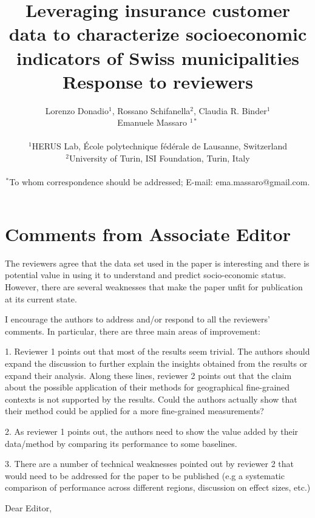 \documentclass[12pt]{article}
\title{Leveraging insurance customer data to characterize socioeconomic indicators of Swiss municipalities \\ \vspace{3mm} Response to reviewers}
\author
{Lorenzo Donadio$^{1}$,  Rossano Schifanella$^{2}$, Claudia R. Binder$^{1}$ \\ Emanuele Massaro $^{1\ast}$\\
\\
\normalsize{$^{1}$HERUS Lab, École polytechnique fédérale de Lausanne, Switzerland}\\
\normalsize{$^{2}$University of Turin, ISI Foundation, Turin, Italy}\\
\\
\normalsize{$^\ast$To whom correspondence should be addressed; E-mail:  ema.massaro@gmail.com.}
}
\date{}
\newenvironment{sciabstract}{%
\begin{quote} \bf}
{\end{quote}}
\begin{document}
 


\baselineskip24pt


\maketitle 




\begin{sciabstract}

\end{sciabstract}


\section*{Comments from Associate Editor}



The reviewers agree that the data set used in the paper is interesting and there is potential value in using it to understand and predict socio-economic status. However, there are several weaknesses that make the paper unfit for publication at its current state.

I encourage the authors to address and/or respond to all the reviewers' comments. In particular, there are three main areas of improvement:

1. Reviewer 1 points out that most of the results seem trivial. The authors should expand the discussion to further explain the insights obtained from the results or expand their analysis. Along these lines, reviewer 2 points out that the claim about the possible application of their methods for geographical fine-grained contexts is not supported by the results. Could the authors actually show that their method could be applied for a more fine-grained measurements?

2. As reviewer 1 points out, the authors need to show the value added by their data/method by comparing its performance to some baselines.

3. There are a number of technical weaknesses pointed out by reviewer 2 that would need to be addressed for the paper to be published (e.g a systematic comparison of performance across different regions, discussion on effect sizes, etc.)

\vspace{1cm}
Dear Editor,
\end{document}

